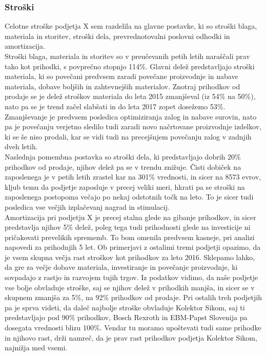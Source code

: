 \documentclass[12pt,a4paper]{amsart}
\theoremstyle{definition} %
\theoremstyle{plain} %
\begin{document}
\subsubsection{Stroški}
Celotne stroške podjetja X sem razdelila na glavne postavke, ki so stroški blaga, materiala in storitev, stroški dela, prevrednotovalni poslovni odhodki in amortizacija.\\
Stroški blaga, materiala in storitev so v preučevanih petih letih naraščali prav tako kot prihodki, s povprečno stopnjo 114\%. Glavni delež predstavljajo stroški materiala, ki so povečani predvsem zaradi povečane proizvodnje in nabave materiala, dobave boljših in zahtevnejših materialov. Znotraj prihodkov od prodaje se je delež stroškov materiala do leta 2015 zmanjševal (iz 54\% na 50\%), nato pa se je trend začel slabšati in do leta 2017 zopet dosežemo 53\%. Zmanjševanje je predvsem posledica optimiziranja zalog in nabave surovin, nato pa je povečanju verjetno sledilo tudi zaradi novo načrtovane proizvodnje izdelkov, ki se še niso prodali, kar se vidi tudi na precejšnjem povečanju zalog v zadnjih dveh letih.\\
Naslednja pomembna postavka so stroški dela, ki predstavljajo dobrih 20\% prihodkov od prodaje, njihov delež pa se v trendu znižuje. Čisti dobiček na zaposlenega je v petih letih zrastel kar na 301\% vrednosti, in sicer na 8573 evrov, kljub temu da podjetje zaposluje v precej veliki meri, hkrati pa se stroški na zaposlenega postopoma večajo po nekaj odstotnih točk na leto. To je sicer tudi posledica vse večjih izplačevanj nagrad in stimulacij.\\
Amortizacija pri podjetju X je precej stalna glede na gibanje prihodkov, in sicer predstavlja njihov 5\% delež, poleg tega tudi prihodnosti glede na investicije ni pričakovati prevelikih sprememb. To bom omenila predvsem kasneje, pri analizi napovedi za prihodnjih 5 let.
Ob primerjavi z ostalimi tremi podjetji opazimo, da je vsem skupna večja rast stroškov kot prihodkov za leto 2016. Sklepamo lahko, da gre za večje dobave materiala, investiranje in povečanje proizvodnje, ki sovpadajo z rastjo in razvojem tujih trgov. Iz podatkov vidimo, da naše podjetje vse bolje obvladuje stroške, saj se njihov delež v prihodkih manjša, in sicer se v skupnem zmanjša za 5\%, na 92\% prihodkov od prodaje. Pri ostalih treh podjetjih pa je sprva videti, da daleč najbolje stroške obvladuje Kolektor Sikom, saj ti predstavljajo pod 90\% prihodkov, Bosch Rexroth in EBM-Papst Slovenija pa dosegata vrednosti blizu 100\%. Vendar tu moramo upoštevati tudi same prihodke in njihovo rast, drži namreč, da je prav rast prihodkov podjetja Kolektor Sikom, najnižja med vsemi.
\end{document}
